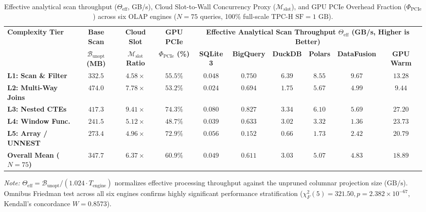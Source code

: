 \documentclass[10pt,a4paper]{article}
\newenvironment{fitasttable}{%
  \begin{lrbox}{\asttblbox}%
}{%
  \end{lrbox}%
  \sbox{\asttblboxB}{%
    \ifdim\wd\asttblbox>0.96\textwidth
      \resizebox{0.96\textwidth}{!}{\usebox{\asttblbox}}%
    \else
      \usebox{\asttblbox}%
    \fi
  }%
  \ifdim\ht\asttblboxB>0.72\textheight
    \resizebox{!}{0.72\textheight}{\usebox{\asttblboxB}}%
  \else
    \usebox{\asttblboxB}%
  \fi
}
\begin{document}
\begin{table}[!htbp]
\centering
\caption{Effective analytical scan throughput ($\Theta_{\text{eff}}$, GB/s), Cloud Slot-to-Wall Concurrency Proxy ($\mathcal{M}_{\text{slot}}$), and GPU PCIe Overhead Fraction ($\Phi_{\text{PCIe}}$) across six OLAP engines ($N=75$ queries, 100\% full-scale TPC-H $\text{SF}=1\text{ GB}$).}\label{tab:jbd_throughput_t6}
\label{tab:throughput_and_cost}
\renewcommand{\arraystretch}{1.20}
\begin{fitasttable}
\begin{tabular}{@{}lccccccccc@{}}
\toprule
\multirow{2}{*}{\textbf{Complexity Tier}} & \textbf{Base Scan} & \textbf{Cloud Slot} & \textbf{GPU PCIe} & \multicolumn{6}{c}{\textbf{Effective Analytical Scan Throughput $\Theta_{\text{eff}}$ (GB/s, Higher is Better)}} \\
\cmidrule(lr){5-10}
 & \textbf{$\mathcal{B}_{\text{unopt}}$ (MB)} & \textbf{$\mathcal{M}_{\text{slot}}$ Ratio} & \textbf{$\Phi_{\text{PCIe}}$ (\%)} & \textbf{SQLite 3} & \textbf{BigQuery} & \textbf{DuckDB} & \textbf{Polars} & \textbf{DataFusion} & \textbf{GPU Warm} \\
\midrule
\textbf{L1: Scan \& Filter} & $332.5$ & $4.58\times$ & $55.5\%$ & $0.048$ & $0.750$ & $6.39$ & $8.55$ & $\mathbf{9.67}$ & $\mathbf{13.28}$ \\
\textbf{L2: Multi-Way Joins} & $474.0$ & $7.78\times$ & $53.2\%$ & $0.024$ & $0.694$ & $1.75$ & $\mathbf{5.67}$ & $4.99$ & $\mathbf{9.44}$ \\
\textbf{L3: Nested CTEs} & $417.3$ & $\mathbf{9.41\times}$ & $74.3\%$ & $0.080$ & $0.827$ & $3.34$ & $\mathbf{6.10}$ & $5.69$ & $\mathbf{27.20}$ \\
\textbf{L4: Window Func.} & $241.5$ & $5.12\times$ & $\mathbf{48.7\%}$ & $0.039$ & $0.633$ & $3.02$ & $\mathbf{3.32}$ & $1.36$ & $\mathbf{23.73}$ \\
\textbf{L5: Array / UNNEST} & $273.4$ & $4.96\times$ & $72.9\%$ & $0.056$ & $0.152$ & $0.66$ & $1.73$ & $\mathbf{2.42}$ & $\mathbf{20.79}$ \\
\midrule
\textbf{Overall Mean ($N=75$)} & $\mathbf{347.7}$ & $\mathbf{6.37\times}$ & $\mathbf{60.9\%}$ & $\mathbf{0.049}$ & $\mathbf{0.611}$ & $\mathbf{3.03}$ & $\mathbf{5.07}$ & $\mathbf{4.83}$ & $\mathbf{18.89}$ \\
\bottomrule
\end{tabular}
\end{fitasttable}%
\vspace{2pt}
\parbox{0.96\textwidth}{\scriptsize \textit{Note:} $\Theta_{\text{eff}} = \mathcal{B}_{\text{unopt}} / (1.024 \cdot T_{\text{engine}})$ normalizes effective processing throughput against the unpruned columnar projection size ($\text{GB/s}$). Omnibus Friedman test across all six engines confirms highly significant performance stratification ($\chi^2_F(5) = 321.50, p = 2.382 \times 10^{-67}$, Kendall's concordance $W = 0.8573$).}
\end{table}
\end{document}
